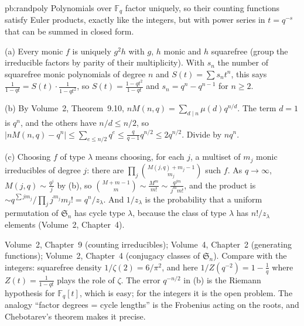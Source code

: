 \begin{solution}{pb:randpoly}
\idea Polynomials over $\mathbb F_q$ factor uniquely, so their counting functions satisfy Euler products, exactly like the
integers, but with power series in $t=q^{-s}$ that can be summed in closed form.

\writeup (a) Every monic $f$ is uniquely $g^2h$ with $g$, $h$ monic and $h$ squarefree (group the irreducible factors by parity of
their multiplicity). With $s_n$ the number of squarefree monic polynomials of degree $n$ and $S(t)=\sum s_nt^n$, this says
$\frac1{1-qt}=S(t)\cdot\frac1{1-qt^2}$, so $S(t)=\frac{1-qt^2}{1-qt}$ and $s_n=q^n-q^{n-1}$ for $n\ge2$.

(b) By Volume~2, Theorem~9.10, $nM(n,q)=\sum_{d\mid n}\mu(d)q^{n/d}$. The term $d=1$ is $q^n$, and the others have $n/d\le n/2$, so
$|nM(n,q)-q^n|\le\sum_{e\le n/2}q^e\le\frac q{q-1}q^{n/2}\le2q^{n/2}$. Divide by $nq^n$.

(c) Choosing $f$ of type $\lambda$ means choosing, for each $j$, a multiset of $m_j$ monic irreducibles of degree $j$: there are
$\prod_j\binom{M(j,q)+m_j-1}{m_j}$ such $f$. As $q\to\infty$, $M(j,q)\sim\frac{q^j}j$ by (b), so
$\binom{M+m-1}m\sim\frac{M^m}{m!}\sim\frac{q^{jm}}{j^mm!}$, and the product is $\sim q^{\sum jm_j}/\prod_jj^{m_j}m_j!=q^n/z_\lambda$. And
$1/z_\lambda$ is the probability that a uniform permutation of $\mathfrak S_n$ has cycle type $\lambda$, because the class of type
$\lambda$ has $n!/z_\lambda$ elements (Volume~2, Chapter~4).

\tools Volume~2, Chapter~9 (counting irreducibles); Volume~4, Chapter~2 (generating functions); Volume~2, Chapter~4 (conjugacy classes of
$\mathfrak S_n$).
\leads Compare with the integers: squarefree density $1/\zeta(2)=6/\pi^2$, and here $1/Z(q^{-2})=1-\frac1q$ where
$Z(t)=\frac1{1-qt}$ plays the role of $\zeta$. The error $q^{-n/2}$ in (b) is the Riemann hypothesis for $\mathbb F_q[t]$, which is
easy; for the integers it is the open problem. The analogy ``factor degrees = cycle lengths'' is the Frobenius acting on the roots,
and Chebotarev's theorem makes it precise.
\end{solution}

